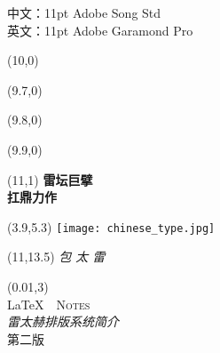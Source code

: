 
\newpage
\thispagestyle{empty}
\vspace*{\fill}
\begin{center}
中文：11pt Adobe Song Std\\
英文：11pt Adobe Garamond Pro
\end{center}
\vspace{\fill}

\begin{titlepage}

\setlength\parindent{0pt}


\begin{textblock}{6}(10,0)
    \rule{0mm}{420mm}
\end{textblock}

\begin{textblock}{.02}(9.7,0)
    \rule{0mm}{420mm}
\end{textblock}

\begin{textblock}{.02}(9.8,0)
    \rule{0mm}{420mm}
\end{textblock}

\begin{textblock}{.02}(9.9,0)
    \rule{0mm}{420mm}
\end{textblock}

\begin{textblock}{3}(11,1)
    {\Huge \textbf{雷坛巨擘}\\[5pt] \textbf{扛鼎力作}}
\end{textblock}

\begin{textblock}{12.8}(3.9,5.3)
\textblockcolour{}
    \texttt{[image: chinese\_type.jpg]}
\end{textblock}

\begin{textblock}{4}(11,13.5)
    {\huge \textit{包 太 雷}}\\[5pt]
    {\Large \lnotesdate}
\end{textblock}

\TPshowboxestrue
\setlength\TPboxrulesize{0.8pt}

\begin{textblock}{14}(0.01,3)
    \centering
    ~\\[20pt]
    {\fontsize{32}{40}\selectfont \LaTeX\ \ \textsc{Notes}}\\[8pt]
    {\huge \textit{雷太赫排版系统简介}}\\[8pt]
    第二版\ \ \lnotesversion\\[20pt]
\end{textblock}
~
\end{titlepage}

